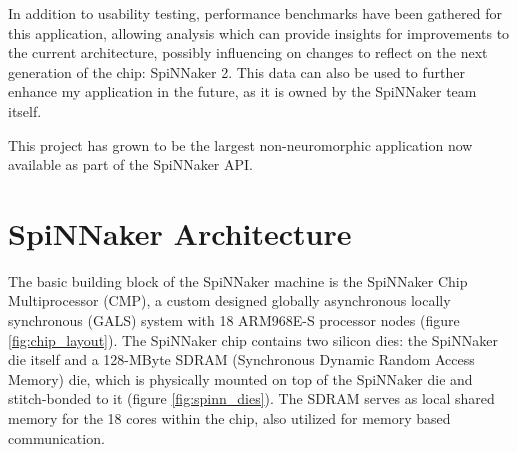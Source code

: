 In addition to usability testing, performance benchmarks have been gathered for this application, allowing analysis which can provide insights for improvements to the current architecture, possibly influencing on changes to reflect on the next generation of the chip: SpiNNaker 2. This data can also be used to further enhance my application in the future, as it is owned by the SpiNNaker team itself.

This project has grown to be the largest non-neuromorphic application now available as part of the SpiNNaker API.

\section{SpiNNaker Architecture}

The basic building block of the SpiNNaker machine is the SpiNNaker Chip Multiprocessor (CMP), a custom designed globally asynchronous locally synchronous (GALS) system with 18 ARM968E-S processor nodes (figure \ref{fig:chip_layout}). \cite{painkras}
The SpiNNaker chip contains two silicon dies: the SpiNNaker die itself and a 128-MByte SDRAM (Synchronous Dynamic Random Access Memory) die, which is physically mounted on top of the SpiNNaker die and stitch-bonded to it (figure \ref{fig:spinn_dies}). \cite{spinnchip} The SDRAM serves as local shared memory for the 18 cores within the chip, also utilized for memory based communication. \cite{datasheet}

